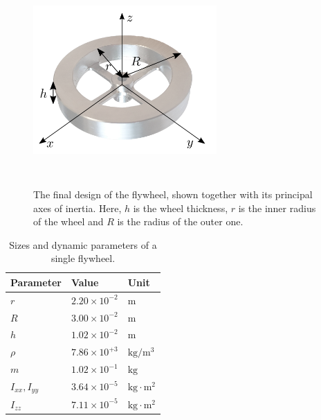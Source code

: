 \documentclass[sensors,article,accept,pdftex,moreauthors]{Definitions/mdpi}
\begin{document}
\begin{figure}[H]%
 
	\includegraphics[width=7cm,height=8cm,keepaspectratio]{figures/flywheel_opaque.png}
	\caption{\small The final design of the flywheel, shown together with its principal axes of inertia. Here, $h$ is the wheel thickness, $r$ is the inner radius of the wheel and $R$ is the radius of the outer one.}
	\label{fig:flywheel}
\end{figure}

\vspace{-6pt}
\begin{table}[H]%
	\caption{Sizes %
 and dynamic parameters of a single flywheel.}
	\label{tab:dim_fw}
	\begin{tabularx}{\textwidth}{CCC}
		\toprule
		\textbf{Parameter} & \textbf{Value} & \textbf{Unit}\\
		\midrule
		$r$ & $2.20 \times 10^{-2}$ & $\mathrm{m}$ \\
		$R$ & $3.00\times 10^{-2}$ & $\mathrm{m}$ \\
		$h$   & $1.02\times 10^{-2}$ & $\mathrm{m}$ \\
		$\rho$   & $7.86 \times 10^{+3}$ & $\mathrm{kg/m^3}$ \\
		$m$   & $1.02\times 10^{-1}$ & $\mathrm{kg}$ \\
		$I_{xx}, I_{yy}$   & $3.64 \times 10^{-5}$ & $\mathrm{kg \cdot m^2}$ \\
		$I_{zz}$   & $7.11 \times 10^{-5}$ & $ \mathrm{kg \cdot m^2}$\\
		\bottomrule	\end{tabularx}
\end{table}
 
\end{document}
